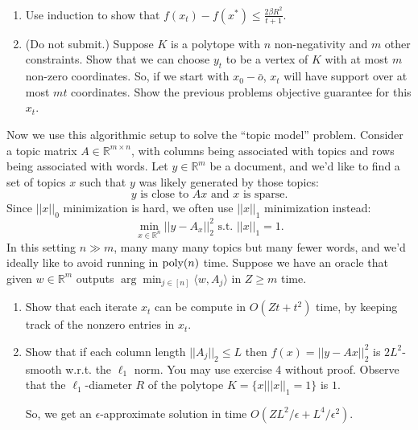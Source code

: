 \documentclass{article}
\theoremstyle{plain}
\newcommand{\R}{\mathbb{R}}
\begin{document}
\begin{enumerate}
\begin{enumerate}
        \[f(x_{t+1}) - f(x_t) \leq \eta_t \left(f(x^*) - f(x_t)\right) + \frac{\beta}{2} \eta^2_t R^2\]
        \item Use induction to show that $f(x_t) - f(x^*) \leq \frac{2\beta R^2}{t+1}$.
        \item (Do not submit.) Suppose $K$ is a polytope with $n$
          non-negativity and $m$ other constraints. Show that we can
          choose $y_t$ to be a vertex of $K$ with at most $m$ non-zero
          coordinates. So, if we start with $x_0 - \bar{o}$, $x_t $
          will have support over at most $mt$ coordinates.  Show the
          previous problems objective guarantee for this $x_t$.
        \end{enumerate}

          Now we use this algorithmic setup to solve the ``topic
          model'' problem. Consider a topic matrix
          $A\in \R^{m \times n}$, with columns being associated with
          topics and rows being associated with words. Let $y\in \R^m$
          be a document, and we'd like to find a set of topics $x$
          such that $y$ was likely generated by those topics:          \[ y \textrm { is close to } Ax \textrm{    and   } x \textrm{ is sparse.}\]
          Since $||x||_0$  minimization is hard, we often use $||x ||_1$ minimization instead:
          \[\min_{x\in \R^n} || y - A_x||_2^2 \textrm{ s.t. } ||x||_1 = 1.\]
          In this setting $n \gg m$, many many many topics but many fewer words, and we'd ideally like to avoid running in $\textrm{poly}(n)$ time. Suppose we have an oracle that given $w\in \R^m$ outputs $\arg\min_{j\in[n]} \langle w, A_j\rangle$ in $Z \geq m$ time.
            \begin{enumerate}
          \item[(d)] Show that each iterate $x_t$ can be compute in $O(Zt + t^2)$ time, by keeping track of the nonzero entries in $x_t$.
          \item[ (e)] Show that if each column length $||A_j||_2 \leq L$ then $f(x) = || y - Ax||^2_2$ is $2L^2$-smooth w.r.t. the $\ell_1$ norm. You may use exercise 4 without proof. Observe that the $\ell_1$-diameter $R$ of the polytope $K = \{x | ||x||_1 = 1\}$ is $1$.
            
            So, we get an $\epsilon$-approximate solution in time $O(ZL^2/\epsilon + L^4/\epsilon^2)$.
          \end{enumerate}
\end{enumerate}
\end{document}
